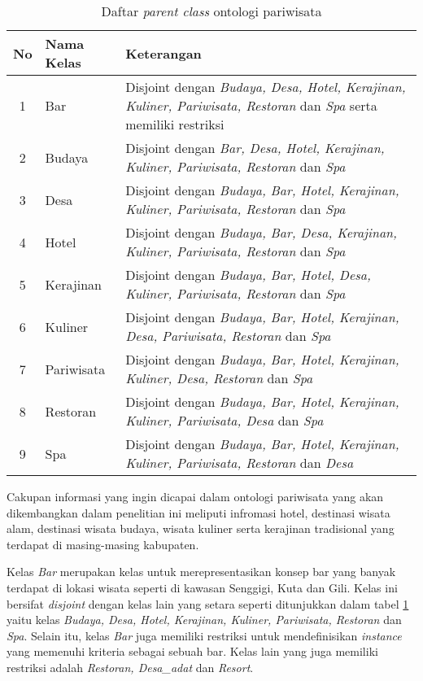 \begin{table}[hb]
	\caption{Daftar \emph{parent class} ontologi pariwisata}
	\label{tab:parent_class_ontopar}
	\centering

	\begin{tabularx}{\textwidth}{|c|l|X|}
	\hline

	\hline
	\textbf{No} & \textbf{Nama Kelas} & \textbf{Keterangan} \\
	\hline
		1 & Bar & Disjoint dengan \emph{Budaya, Desa, Hotel, Kerajinan, Kuliner, Pariwisata, Restoran} dan \emph{Spa} serta memiliki restriksi\\
	\hline
		2 & Budaya & Disjoint dengan \emph{Bar, Desa, Hotel, Kerajinan, Kuliner, Pariwisata, Restoran} dan \emph{Spa}\\
	\hline
		3 & Desa & Disjoint dengan \emph{Budaya, Bar, Hotel, Kerajinan, Kuliner, Pariwisata, Restoran} dan \emph{Spa}\\
	\hline
		4 & Hotel & Disjoint dengan \emph{Budaya, Bar, Desa, Kerajinan, Kuliner, Pariwisata, Restoran} dan \emph{Spa}\\
	\hline
		5 & Kerajinan & Disjoint dengan \emph{Budaya, Bar, Hotel, Desa, Kuliner, Pariwisata, Restoran} dan \emph{Spa}\\
	\hline
		6 & Kuliner & Disjoint dengan \emph{Budaya, Bar, Hotel, Kerajinan, Desa, Pariwisata, Restoran} dan \emph{Spa}\\
	\hline
		7 & Pariwisata & Disjoint dengan \emph{Budaya, Bar, Hotel, Kerajinan, Kuliner, Desa, Restoran} dan \emph{Spa}\\
	\hline
		8 & Restoran & Disjoint dengan \emph{Budaya, Bar, Hotel, Kerajinan, Kuliner, Pariwisata, Desa} dan \emph{Spa}\\
	\hline 
		9 & Spa & Disjoint dengan \emph{Budaya, Bar, Hotel, Kerajinan, Kuliner, Pariwisata, Restoran} dan \emph{Desa}\\
	\hline
	\end{tabularx}
\end{table}

Cakupan informasi yang ingin dicapai dalam ontologi pariwisata yang akan dikembangkan dalam penelitian ini meliputi infromasi hotel, destinasi wisata alam, destinasi wisata budaya, wisata kuliner serta kerajinan tradisional yang terdapat di masing-masing kabupaten.

Kelas \emph{Bar} merupakan kelas untuk merepresentasikan konsep bar yang banyak terdapat di lokasi wisata seperti di kawasan Senggigi, Kuta dan Gili. Kelas ini bersifat \emph{disjoint} dengan kelas lain yang setara seperti ditunjukkan dalam tabel \ref{tab:parent_class_ontopar} yaitu kelas \emph{Budaya, Desa, Hotel, Kerajinan, Kuliner, Pariwisata, Restoran} dan \emph{Spa}. Selain itu, kelas \emph{Bar} juga memiliki restriksi untuk mendefinisikan \emph{instance} yang memenuhi kriteria sebagai sebuah bar. Kelas lain yang juga memiliki restriksi adalah \emph{Restoran, Desa\_adat} dan \emph{Resort}.

